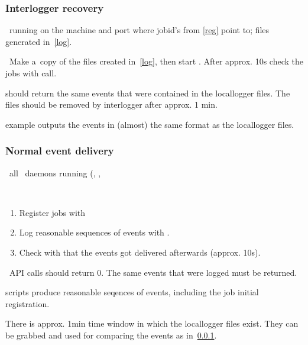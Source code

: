 \subsubsection{Interlogger recovery}
\label{recover}
\req\ running  on the machine and port where 
jobid's from \ref{reg} point to; files generated in~\ref{log}.

\how\ Make a~copy of the files created in~\ref{log}, then start
. After approx. 10s check the jobs
with  call. 

\result {} should return the same events that were
contained in the locallogger files. The files should be removed by 
interlogger after approx. 1 min.

\begin{hints}
 example outputs the events in (almost) the same
format as the locallogger files.
\end{hints}

\subsubsection{Normal event delivery}
\label{normal}
\req\ all \LB\ daemons running (, ,

\how\
\begin{enumerate}

\item Register jobs with  
\item Log reasonable sequences of events with .
\item Check with \code{edg\_wll\_JobLog}
that the events got delivered afterwards (approx. 10s).
\end{enumerate}

\result\ API calls should return 0. The same events that were logged must be returned.

\begin{hints}
 scripts produce reasonable seqences of events, including
the job initial registration.

There is approx. 1min time window in which the locallogger files exist.
They can be grabbed and used for comparing the events as in~\ref{recover}.

\end{hints}

